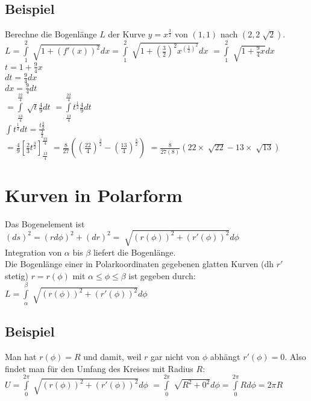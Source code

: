 \documentclass[../main.tex]{subfiles}
\begin{document}
\subsection{Beispiel}
Berechne die Bogenlänge $L$ der Kurve $y=x^{\frac{3}{2}}$ von $(1,1)$ nach $(2,2\sqrt[]{2})$. \\ [7pt]
$L=\int\limits_1^2\sqrt[]{1+(f'(x))^2}dx = \int\limits_1^2\sqrt[]{1+(\frac{3}{2})^2x^{(\frac{1}{2})^2}}dx$
$=\int\limits_1^2\sqrt[]{1+\frac{9}{4}x}dx$ \\ [7pt]
$t=1+\frac{9}{4}x$ \\ [7pt]
$dt=\frac{9}{4}dx$ \\ [7pt]
$dx=\frac{9}{4}dt$ \\ [7pt]
$=\int\limits_{\frac{13}{4}}^{\frac{22}{4}}\sqrt[]{t}\frac{4}{9}dt$
$=\int\limits_{\frac{13}{4}}^{\frac{22}{4}}t^{\frac{1}{2}}\frac{4}{9}dt$ \\ [7pt]
$\int t^{\frac{1}{2}}dt=\frac{t\frac{3}{2}}{\frac{3}{2}}$ \\ [7pt]
$=\frac{4}{9}\left[\frac{2}{3}t^{\frac{3}{2}}\right]_{\frac{13}{4}}^{\frac{22}{4}}$
$=\frac{8}{27}((\frac{22}{4})^{\frac{3}{2}}-(\frac{13}{4})^{\frac{3}{2}})$
$=\frac{8}{27(8)}(22\times\sqrt[]{22}-13\times\sqrt[]{13})$

\section{Kurven in Polarform}
Das Bogenelement ist \\
$(ds)^2=(rd\phi)^2+(dr)^2 = \sqrt[]{(r(\phi))^2+(r'(\phi))^2}d\phi$ \\
Integration von $\alpha$ bis $\beta$ liefert die Bogenlänge. \\
Die Bogenlänge einer in Polarkoordinaten gegebenen glatten Kurven (dh $r'$ stetig)
$r=r(\phi)$ mit $\alpha \leq \phi \leq \beta$ ist gegeben durch: \\
$L=\int\limits_\alpha^\beta\sqrt[]{(r(\phi))^2+(r'(\phi))^2}d\phi$

\subsection{Beispiel}
Man hat $r(\phi)=R$ und damit, weil $r$ gar nicht von $\phi$ abhängt $r'(\phi)=0$.
Also findet man für den Umfang des Kreises mit Radius $R$: \\
$U=\int\limits_0^{2\pi}\sqrt[]{(r(\phi))^2+(r'(\phi))^2}d\phi$
$=\int\limits_0^{2\pi}\sqrt[]{R^2+0^2}d\phi = \int\limits_0^{2\pi}Rd\phi = 2\pi R$
\end{document}
